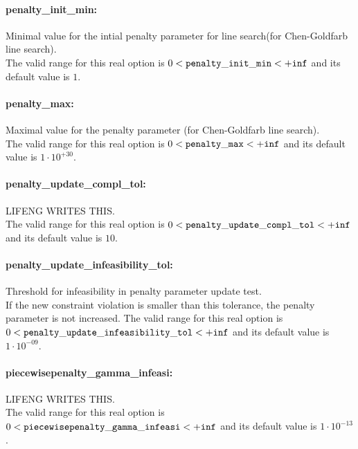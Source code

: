 \paragraph{penalty\_init\_min:}\label{sec:penalty_init_min} Minimal value for the intial penalty parameter for line search(for Chen-Goldfarb line search). $\;$ \\
 The valid range for this real option is 
$0 <  {\tt penalty\_init\_min } <  {\tt +inf}$
and its default value is $1$.


\paragraph{penalty\_max:}\label{sec:penalty_max} Maximal value for the penalty parameter (for Chen-Goldfarb line search). $\;$ \\
 The valid range for this real option is 
$0 <  {\tt penalty\_max } <  {\tt +inf}$
and its default value is $1 \cdot 10^{+30}$.


\paragraph{penalty\_update\_compl\_tol:}\label{sec:penalty_update_compl_tol} LIFENG WRITES THIS. $\;$ \\
 The valid range for this real option is 
$0 <  {\tt penalty\_update\_compl\_tol } <  {\tt +inf}$
and its default value is $10$.


\paragraph{penalty\_update\_infeasibility\_tol:}\label{sec:penalty_update_infeasibility_tol} Threshold for infeasibility in penalty parameter update test. $\;$ \\
 If the new constraint violation is smaller than
this tolerance, the penalty parameter is not
increased. The valid range for this real option is 
$0 <  {\tt penalty\_update\_infeasibility\_tol } <  {\tt +inf}$
and its default value is $1 \cdot 10^{-09}$.


\paragraph{piecewisepenalty\_gamma\_infeasi:}\label{sec:piecewisepenalty_gamma_infeasi} LIFENG WRITES THIS. $\;$ \\
 The valid range for this real option is 
$0 <  {\tt piecewisepenalty\_gamma\_infeasi } <  {\tt +inf}$
and its default value is $1 \cdot 10^{-13}$.


